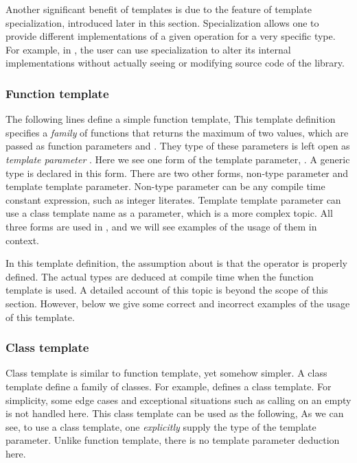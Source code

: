 Another significant benefit of templates is due to the \cpp feature of
template specialization, introduced later in this section. Specialization
allows one to provide different implementations of a given operation for a
very specific type. For example, in \vsmc, the user can use specialization to
alter its internal implementations without actually seeing or modifying
source code of the library.

\subsubsection{Function template}
\label{ssub:Function template}

The following lines define a simple function template,
This template definition specifies a \emph{family} of functions that returns
the maximum of two values, which are passed as function parameters
 and . They type of these parameters is left open as
\emph{template parameter} . Here we see one form of the template
parameter, . A generic type is declared in this form.
There are two other forms, non-type parameter and template template parameter.
Non-type parameter can be any compile time constant expression, such as
integer literates. Template template parameter can use a class template name
as a parameter, which is a more complex topic. All three forms are used in
\vsmc, and we will see examples of the usage of them in context.

In this template definition, the assumption about  is that the
operator \cppinline{<} is properly defined. The actual types are deduced at
compile time when the function template is used. A detailed account of this
topic is beyond the scope of this section. However, below we give some correct
and incorrect examples of the usage of this template.

\subsubsection{Class template}
\label{ssub:Class template}

Class template is similar to function template, yet somehow simpler. A class
template define a family of classes. For example,
defines a  class template. For simplicity, some edge cases
and exceptional situations such as calling  on an empty
 is not handled here. This class template can be used as the
following,
As we can see, to use a class template, one \emph{explicitly} supply the type
of the template parameter. Unlike function template, there is no template
parameter deduction here.

